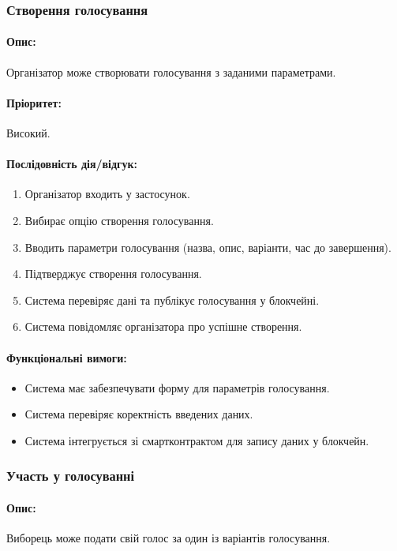 \documentclass[14pt]{extreport}
\newcounter{req}[subsubsection]
\newcommand\req{\arabic{req}\stepcounter{req}}
\begin{document}
  \subsubsection{Створення голосування}  
  \paragraph{Опис:} Організатор може створювати голосування з заданими параметрами.  
  \paragraph{Пріоритет:} Високий.
  \paragraph{Послідовність дія/відгук:}  
  \begin{enumerate}  
      \item Організатор входить у застосунок.  
      \item Вибирає опцію створення голосування.  
      \item Вводить параметри голосування (назва, опис, варіанти, час до завершення).  
      \item Підтверджує створення голосування.  
      \item Система перевіряє дані та публікує голосування у блокчейні.  
      \item Система повідомляє організатора про успішне створення.  
  \end{enumerate}
  \paragraph{Функціональні вимоги:}
  \begin{itemize}[leftmargin=*,label=REQ-.\req:]  
      \item Система має забезпечувати форму для параметрів голосування.
      \item Система перевіряє коректність введених даних.
      \item Система інтегрується зі смартконтрактом для запису даних у блокчейн.  
  \end{itemize}

  \subsubsection{Участь у голосуванні}  
  \paragraph{Опис:} Виборець може подати свій голос за один із варіантів голосування.  
\end{document}
